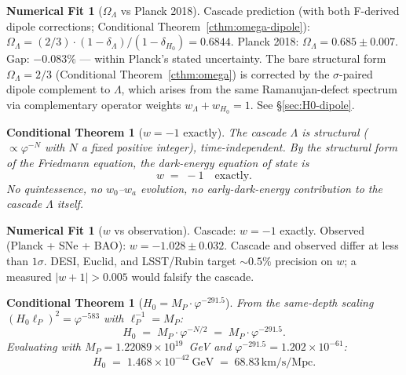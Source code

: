 \documentclass[11pt]{article}
\theoremstyle{plain}
\newtheorem{conditional}[theorem]{Conditional Theorem}
\theoremstyle{definition}
\newtheorem{numfit}[theorem]{Numerical Fit}
\theoremstyle{remark}
\begin{document}
\begin{numfit}[$\Omega_\Lambda$ vs Planck 2018]\label{nf:omega}
Cascade prediction (with both F-derived dipole corrections; Conditional Theorem~\ref{cthm:omega-dipole}): $\Omega_\Lambda = (2/3) \cdot (1-\delta_\Lambda)/(1-\delta_{H_0}) = 0.6844$. Planck 2018: $\Omega_\Lambda = 0.685 \pm 0.007$. Gap: $\mathbf{-0.083\%}$ --- within Planck's stated uncertainty. The bare structural form $\Omega_\Lambda = 2/3$ (Conditional Theorem~\ref{cthm:omega}) is corrected by the $\sigma$-paired dipole complement to $\Lambda$, which arises from the same Ramanujan-defect spectrum via complementary operator weights $w_\Lambda + w_{H_0} = 1$. See \S\ref{sec:H0-dipole}.
\end{numfit}

\begin{conditional}[$w = -1$ exactly]\label{cthm:w}
The cascade $\Lambda$ is structural ($\propto \varphi^{-N}$ with $N$ a fixed positive integer), time-independent. By the structural form of the Friedmann equation, the dark-energy equation of state is
\[
  w \;=\; -1 \quad\text{exactly.}
\]
No quintessence, no $w_0$--$w_a$ evolution, no early-dark-energy contribution to the cascade $\Lambda$ itself.
\end{conditional}

\begin{numfit}[$w$ vs observation]\label{nf:w}
Cascade: $w = -1$ exactly. Observed (Planck + SNe + BAO): $w = -1.028 \pm 0.032$. Cascade and observed differ at less than $1\sigma$. DESI, Euclid, and LSST/Rubin target $\sim 0.5\%$ precision on $w$; a measured $|w + 1| > 0.005$ would falsify the cascade.
\end{numfit}

\begin{conditional}[$H_0 = M_P \cdot \varphi^{-291.5}$]\label{cthm:H0}
From the same-depth scaling $(H_0 \ell_P)^2 = \varphi^{-583}$ with $\ell_P^{-1} = M_P$:
\[
  H_0 \;=\; M_P \cdot \varphi^{-N/2} \;=\; M_P \cdot \varphi^{-291.5}.
\]
Evaluating with $M_P = 1.22089 \times 10^{19}$~GeV and $\varphi^{-291.5} = 1.202 \times 10^{-61}$:
\[
  H_0 \;=\; 1.468 \times 10^{-42}~\mathrm{GeV} \;=\; 68.83\,\text{km/s/Mpc}.
\]
\end{conditional}
\end{document}
